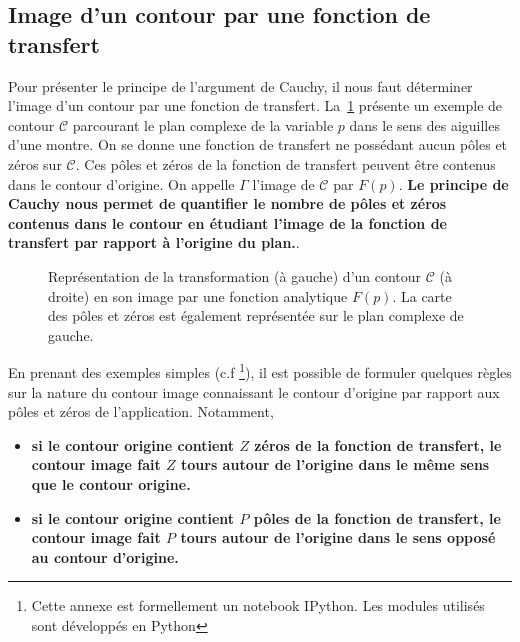 \subsection{Image d'un contour par une fonction de transfert}
Pour présenter le principe de l'argument de Cauchy, il nous faut déterminer
l'image d'un contour par une fonction de transfert. 
La~\cref{fig-contour_cauchy} présente un exemple de contour $\mathcal{C}$ 
parcourant le plan complexe de la variable $p$ dans le sens des aiguilles 
d'une montre. On se donne une fonction de transfert ne possédant aucun pôles 
et zéros sur $\mathcal{C}$. 
Ces pôles et zéros de la fonction de transfert peuvent être contenus dans le 
contour d'origine. On appelle $\Gamma$ l'image de $\mathcal{C}$ par $F(p)$. 
\textbf{Le principe de Cauchy nous permet de quantifier le nombre de pôles et 
zéros contenus dans le contour en étudiant l'image de la fonction de transfert 
par rapport à l'origine du plan.}.
\begin{figure}[!h]
    \centering
    
    \caption{Représentation de la transformation (à gauche) d'un contour 
             $\mathcal{C}$ (à droite) en son image par une fonction analytique 
             $F(p)$. La carte des pôles et zéros est également représentée 
             sur le plan complexe de gauche.
    \label{fig-contour_cauchy}}
\end{figure}

En prenant des exemples simples (c.f \footnote{Cette 
annexe est formellement un notebook IPython. Les modules utilisés sont 
développés en Python}), il est possible de formuler quelques règles sur la 
nature du contour image connaissant le contour d'origine par rapport aux
pôles et zéros de l'application. Notamment,
\begin{itemize}
    \item \textbf{si le contour origine contient $Z$ zéros de la fonction de 
          transfert, le contour image fait $Z$ tours autour de l'origine dans 
          le même sens que le contour origine.}
    \item \textbf{si le contour origine contient $P$ pôles de la fonction de 
          transfert, le contour image fait $P$ tours autour de l'origine dans 
          le sens opposé au contour d'origine.}
\end{itemize}
\clearpage
{}
\captionsetup{width=0.9\linewidth}
